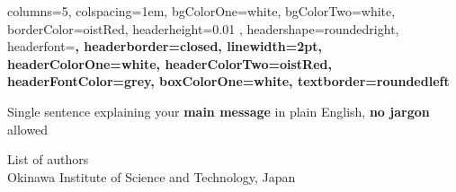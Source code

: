 \documentclass[
    a0paper, %
    landscape, %
    fontscale=0.4 %
    ]{baposter}
\begin{document}
\begin{poster}{ %
    columns=5, %
    colspacing=1em, %
    bgColorOne=white, %
    bgColorTwo=white, %
    borderColor=oistRed, %
    headerheight=0.01 \textheight, %
    headershape=roundedright, %
    headerfont=\Large\bf\textsc, %
    headerborder=closed, %
    linewidth=2pt, %
    headerColorOne=white, %
    headerColorTwo=oistRed, %
    headerFontColor=grey, %
    boxColorOne=white, %
    textborder=roundedleft %
}{}{}{}{} %

\begin{posterbox}[
    name = message,  %
    column = 1, %
    span = 3, %
    boxColorOne=oistRed, %
    headershade=plain,  %
    headerColorOne=oistRed %
    ]{}
    \fontsize{45}{50} \selectfont  \color{white} %
    
    \vspace{2em} 
    
    \hspace{1em}
    \begin{minipage}[c][ 0.5 \textheight ]{0.6\textwidth}

        Single sentence explaining your  \textbf{main message} in plain English, \textbf{no jargon} allowed

        \vspace{2em}
        
        \LARGE 
        List of authors\\ 
        Okinawa Institute of Science and Technology, Japan
    \end{minipage}


\end{posterbox}
\end{poster}
\end{document}
